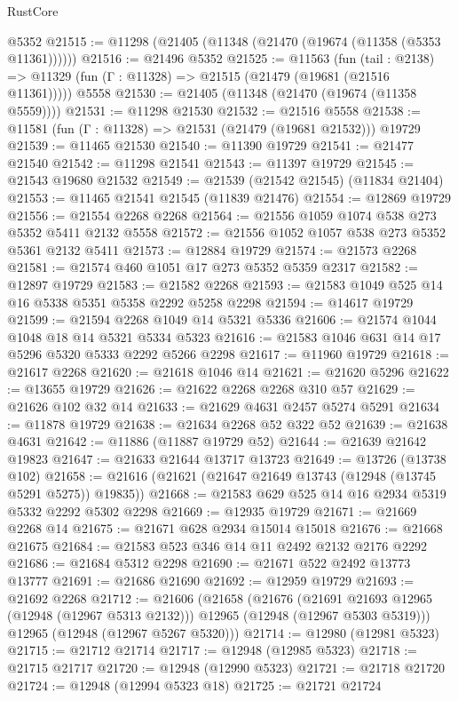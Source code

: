 \begin{lexlean}{RustCore}
\begin{coremodule}
    @5352
@21515 := @11298 (@21405 (@11348 (@21470 (@19674 (@11358 (@5353 @11361))))))
@21516 := @21496 @5352
@21525 := @11563
    (fun (tail : @2138) => @11329 (fun (Γ : @11328) => @21515 (@21479 (@19681 (@21516 @11361)))))
    @5558
@21530 := @21405 (@11348 (@21470 (@19674 (@11358 @5559))))
@21531 := @11298 @21530
@21532 := @21516 @5558
@21538 := @11581 (fun (Γ : @11328) => @21531 (@21479 (@19681 @21532))) @19729
@21539 := @11465 @21530
@21540 := @11390 @19729
@21541 := @21477 @21540
@21542 := @11298 @21541
@21543 := @11397 @19729
@21545 := @21543 @19680 @21532
@21549 := @21539 (@21542 @21545) (@11834 @21404)
@21553 := @11465 @21541 @21545 (@11839 @21476)
@21554 := @12869 @19729
@21556 := @21554 @2268 @2268
@21564 := @21556 @1059 @1074 @538 @273 @5352 @5411 @2132 @5558
@21572 := @21556 @1052 @1057 @538 @273 @5352 @5361 @2132 @5411
@21573 := @12884 @19729
@21574 := @21573 @2268
@21581 := @21574 @460 @1051 @17 @273 @5352 @5359 @2317
@21582 := @12897 @19729
@21583 := @21582 @2268
@21593 := @21583 @1049 @525 @14 @16 @5338 @5351 @5358 @2292 @5258 @2298
@21594 := @14617 @19729
@21599 := @21594 @2268 @1049 @14 @5321 @5336
@21606 := @21574 @1044 @1048 @18 @14 @5321 @5334 @5323
@21616 := @21583 @1046 @631 @14 @17 @5296 @5320 @5333 @2292 @5266 @2298
@21617 := @11960 @19729
@21618 := @21617 @2268
@21620 := @21618 @1046 @14
@21621 := @21620 @5296
@21622 := @13655 @19729
@21626 := @21622 @2268 @2268 @310 @57
@21629 := @21626 @102 @32 @14
@21633 := @21629 @4631 @2457 @5274 @5291
@21634 := @11878 @19729
@21638 := @21634 @2268 @52 @322 @52
@21639 := @21638 @4631
@21642 := @11886 (@11887 @19729 @52)
@21644 := @21639 @21642 @19823
@21647 := @21633 @21644 @13717 @13723
@21649 := @13726 (@13738 @102)
@21658 := @21616 (@21621 (@21647 @21649 @13743 (@12948 (@13745 @5291 @5275)) @19835))
@21668 := @21583 @629 @525 @14 @16 @2934 @5319 @5332 @2292 @5302 @2298
@21669 := @12935 @19729
@21671 := @21669 @2268 @14
@21675 := @21671 @628 @2934 @15014 @15018
@21676 := @21668 @21675
@21684 := @21583 @523 @346 @14 @11 @2492 @2132 @2176 @2292
@21686 := @21684 @5312 @2298
@21690 := @21671 @522 @2492 @13773 @13777
@21691 := @21686 @21690
@21692 := @12959 @19729
@21693 := @21692 @2268
@21712 := @21606
    (@21658
      (@21676
        (@21691 @21693 @12965 (@12948 (@12967 @5313 @2132)))
        @12965
        (@12948 (@12967 @5303 @5319)))
      @12965
      (@12948 (@12967 @5267 @5320)))
@21714 := @12980 (@12981 @5323)
@21715 := @21712 @21714
@21717 := @12948 (@12985 @5323)
@21718 := @21715 @21717
@21720 := @12948 (@12990 @5323)
@21721 := @21718 @21720
@21724 := @12948 (@12994 @5323 @18)
@21725 := @21721 @21724

\end{coremodule}
\end{lexlean}
